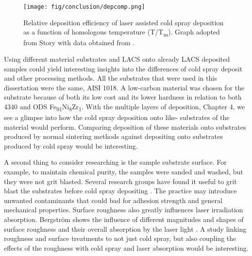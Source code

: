 		\begin{figure}
			\centering
			\texttt{[image: fig/conclusion/depcomp.png]}
			\caption[Relative deposition efficiency of laser assisted cold spray deposition as a function of homologous temperature (T/T\textsubscript{m}).]{Relative deposition efficiency of laser assisted cold spray deposition as a function of homologous temperature (T/T\textsubscript{m}). Graph adopted from Story \cite{RN720} with data obtained from \cite{RN383,RN173,RN135,RN3366}.}
			\label{fig:depcomp}
		\end{figure}
		
		Using different material substrates and LACS onto already LACS deposited samples could yield interesting insights into the differences of cold spray deposit and other processing methods. All the substrates that were used in this dissertation were the same, AISI 1018. A low-carbon material was chosen for the substrate because of both its low cost and its lower hardness in relation to both 4340 and ODS Fe\textsubscript{91}Ni\textsubscript{8}Zr\textsubscript{1}. With the multiple layers of deposition, Chapter 4, we see a glimpse into how the cold spray deposition onto like- substrates of the material would perform. Comparing deposition of these materials onto substrates produced by normal sintering methods against depositing onto substrates produced by cold spray would be interesting. 
		
		
		A second thing to consider researching is the sample substrate surface. For example, to maintain chemical purity, the samples were sanded and washed, but they were not grit blasted. Several research groups have found it useful to grit blast the substrates before cold spray depositing \cite{RN2289,RN1137}. The practice may introduce unwanted contaminants that could bad for adhesion strength and general mechanical properties. Surface roughness also greatly influences laser irradiation absorption. Bergström shows the influence of different magnitudes and shapes of surface roughness and their overall absorption by the laser light \cite{RN1384}. A study linking roughness and surface treatments to not just cold spray, but also coupling the effects of the roughness with cold spray and laser absorption would be interesting.  
	
